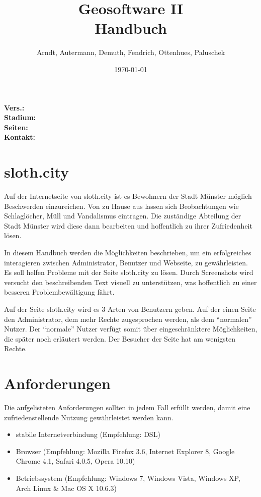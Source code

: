 \documentclass[a4paper,11pt]{scrartcl}
\begin{document}
\title{Geosoftware II \\ \small Handbuch}
\author{Arndt, Autermann, Demuth, Fendrich, Ottenhues, Paluschek}
\date{\today}
\maketitle
\thispagestyle{empty}
\begin{center}
\bf Vers.: \MyVersion \\
\bf Stadium: \MyStatus\\
\bf Seiten: \thelastpage \\
\bf Kontakt: \email \\
\end{center}
\newpage
\tableofcontents
\newpage



\section{sloth.city}
Auf der Internetseite von sloth.city ist es Bewohnern der Stadt Münster möglich Beschwerden einzureichen. Von zu Hause aus lassen sich Beobachtungen wie Schlaglöcher, Müll und Vandalismus eintragen. Die zuständige Abteilung der Stadt Münster wird diese dann bearbeiten und hoffentlich zu ihrer Zufriedenheit lösen.

In diesem Handbuch werden die Möglichkeiten beschrieben, um ein erfolgreiches interagieren zwischen Administrator, Benutzer und Webseite, zu gewährleisten. Es soll helfen Probleme mit der Seite sloth.city zu lösen. Durch Screenshots wird versucht den beschreibenden Text visuell zu unterstützen, was hoffentlich zu einer besseren Problembewältigung fährt.

Auf der Seite sloth.city wird es 3 Arten von Benutzern geben. Auf der einen Seite den Administrator, dem mehr Rechte zugesprochen werden, als dem "`normalen"' Nutzer. Der "`normale"' Nutzer verfügt somit über eingeschränktere Möglichkeiten, die später noch erläutert werden. Der Besucher der Seite hat am wenigsten Rechte.


\section{Anforderungen}
Die aufgelisteten Anforderungen sollten in jedem Fall erfüllt werden, damit eine zufriedenstellende Nutzung gewährleistet werden kann.

\begin{itemize}
	\item stabile Internetverbindung (Empfehlung: DSL)
	\item Browser (Empfehlung: Mozilla Firefox 3.6, Internet Explorer 8, Google Chrome 4.1, Safari 4.0.5, Opera 10.10)
	\item Betriebssystem (Empfehlung: Windows 7, Windows Vista, Windows XP, Arch Linux \& Mac OS X 10.6.3)
\end{itemize} 
\end{document}
